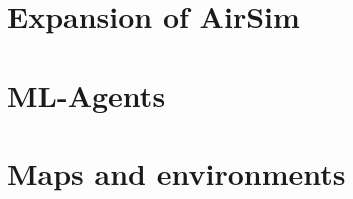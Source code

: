 \section{Expansion of AirSim} \label{06:airsim}


\section{ML-Agents}


\section{Maps and environments}



